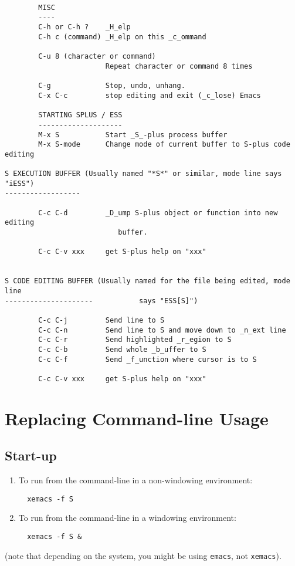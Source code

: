 \documentclass{article}
\begin{document}
\begin{verbatim}
        MISC
        ----
        C-h or C-h ?    _H_elp
        C-h c (command) _H_elp on this _c_ommand

        C-u 8 (character or command)   
                        Repeat character or command 8 times

        C-g             Stop, undo, unhang.
        C-x C-c         stop editing and exit (_c_lose) Emacs  

        STARTING SPLUS / ESS
        --------------------
        M-x S           Start _S_-plus process buffer
        M-x S-mode      Change mode of current buffer to S-plus code editing

S EXECUTION BUFFER (Usually named "*S*" or similar, mode line says "iESS")
------------------

        C-c C-d         _D_ump S-plus object or function into new editing 
                           buffer.

        C-c C-v xxx     get S-plus help on "xxx"


S CODE EDITING BUFFER (Usually named for the file being edited, mode line 
---------------------           says "ESS[S]")

        C-c C-j         Send line to S
        C-c C-n         Send line to S and move down to _n_ext line
        C-c C-r         Send highlighted _r_egion to S
        C-c C-b         Send whole _b_uffer to S
        C-c C-f         Send _f_unction where cursor is to S

        C-c C-v xxx     get S-plus help on "xxx"
\end{verbatim}

\section{Replacing Command-line Usage}
\label{sec:commandline}

\subsection{Start-up}
\label{sec:commandline:startup}

\begin{enumerate}
\item To run from the command-line in a non-windowing environment:
\begin{verbatim}
  xemacs -f S
\end{verbatim}
\item To run from the command-line in a windowing environment:
\begin{verbatim}
  xemacs -f S &
\end{verbatim}
\end{enumerate}
(note that depending on the system, you might be using \verb+emacs+,
not \verb+xemacs+).
\end{document}
